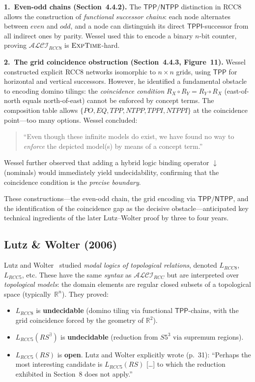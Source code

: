 \documentclass[
]{ceurart}
\theoremstyle{definition}
\newcommand{\ALCIRCC}[1]{\ensuremath{\mathcal{ALCI}_{\mathit{RCC#1}}}}
\newcommand{\LRCC}[1]{\ensuremath{L_{\mathit{RCC#1}}}}
\newcommand{\TPP}{\ensuremath{\mathsf{TPP}}}
\newcommand{\NTPP}{\ensuremath{\mathsf{NTPP}}}
\newcommand{\TPPI}{\ensuremath{\mathsf{TPPI}}}
\newcommand{\EXPTIME}{\textsc{ExpTime}}
\newcommand{\reals}{\mathbb{R}}
\begin{document}
\medskip\noindent\textbf{1.\ Even-odd chains (Section~4.4.2).}
The $\TPP/\NTPP$ distinction in RCC8 allows the construction of
\emph{functional successor chains}: each node alternates between
$\mathit{even}$ and $\mathit{odd}$, and a node can distinguish its
direct $\TPPI$-successor from all indirect ones by parity.
Wessel used this to encode a binary $n$-bit counter, proving
$\ALCIRCC{8}$ is $\EXPTIME$-hard.

\medskip\noindent\textbf{2.\ The grid coincidence obstruction (Section~4.4.3,
Figure~11).}
Wessel constructed explicit RCC8 networks isomorphic to
$n \times n$ grids, using $\TPP$ for horizontal and vertical
successors.  However, he identified a fundamental obstacle to
encoding domino tilings: the \emph{coincidence condition}
$R_X \circ R_Y = R_Y \circ R_X$ (east-of-north equals
north-of-east) cannot be enforced by concept terms.
The composition table allows $\{PO, EQ, TPP, NTPP, TPPI, NTPPI\}$
at the coincidence point---too many options.  Wessel concluded:
\begin{quote}
``Even though these infinite models do exist, we have found no way
to \emph{enforce} the depicted model(s) by means of a concept term.''
\end{quote}
Wessel further observed that adding a hybrid logic binding operator
$\downarrow$ (nominals) would immediately yield undecidability,
confirming that the coincidence condition is the \emph{precise
boundary}.

These constructions---the even-odd chain, the grid encoding via
$\TPP/\NTPP$, and the identification of the coincidence gap as
the decisive obstacle---anticipated key technical ingredients of
the later Lutz--Wolter proof by three to four years.

\subsection{Lutz \& Wolter (2006)}

Lutz and Wolter~\cite{LutzWolter2006} studied \emph{modal logics
of topological relations}, denoted $\LRCC{8}$, $\LRCC{5}$, etc.
These have the same \emph{syntax} as $\ALCIRCC{}$ but are
interpreted over \emph{topological models}: the domain elements
are regular closed subsets of a topological space (typically~$\reals^n$).
They proved:
\begin{itemize}
  \item $\LRCC{8}$ is \textbf{undecidable} (domino tiling via
    functional $\TPP$-chains, with the grid coincidence forced
    by the geometry of $\reals^2$).
  \item $\LRCC{5}(\mathit{RS}^\exists)$ is \textbf{undecidable}
    (reduction from $S5^3$ via supremum regions).
  \item $\LRCC{5}(\mathit{RS})$ is \textbf{open}. Lutz and Wolter
    explicitly wrote (p.~31): ``Perhaps the most interesting
    candidate is $L_{RCC5}(RS)$ [\ldots] to which the reduction
    exhibited in Section~8 does not apply.''
\end{itemize}
\end{document}
